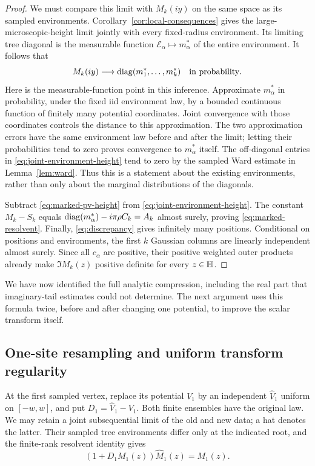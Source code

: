 \begin{proof}
We must compare this limit with $M_k(iy)$ on the same space as its
sampled environments. Corollary~\ref{cor:local-consequences} gives
the large-microscopic-height limit jointly with every fixed-radius
environment. Its limiting tree diagonal is the measurable function
$\mathcal E_\alpha\mapsto m_\alpha^*$ of the entire environment.
It follows that
\begin{equation}\label{eq:joint-environment-height}
 M_k(iy)\longrightarrow\operatorname{diag}(m_1^*,\ldots,m_k^*)
                         \quad\text{in probability}.
\end{equation}
Here is the measurable-function point in this inference. Approximate
$m_\alpha^*$ in probability, under the fixed iid environment law,
by a bounded continuous function of finitely many potential
coordinates. Joint convergence with those coordinates controls the
distance to this approximation. The two approximation errors have
the same environment law before and after the limit; letting their
probabilities tend to zero proves convergence to $m_\alpha^*$ itself.
The off-diagonal entries in \eqref{eq:joint-environment-height} tend
to zero by the sampled Ward estimate in Lemma~\ref{lem:ward}.
Thus this is a statement about the existing environments, rather than
only about the marginal distributions of the diagonals.

Subtract \eqref{eq:marked-pv-height} from
\eqref{eq:joint-environment-height}. The constant $M_k-S_k$ equals
$\operatorname{diag}(m_\alpha^*)-i\pi\rho C_k=A_k$ almost surely, proving
\eqref{eq:marked-resolvent}.
Finally, \eqref{eq:discrepancy} gives infinitely many positions.
Conditional on positions and environments, the first $k$ Gaussian
columns are linearly independent almost surely. Since all $c_\alpha$
are positive, their positive weighted outer products already make
$\Im M_k(z)$ positive definite for every $z\in\mathbb H$.
\end{proof}

We have now identified the full analytic compression, including the
real part that imaginary-tail estimates could not determine. The
next argument uses this formula twice, before and after changing one
potential, to improve the scalar transform itself.

\subsection{One-site resampling and uniform transform regularity}

At the first sampled vertex, replace its potential $V_1$ by an
independent $\widehat V_1$ uniform on $[-w,w]$, and put
$D_1=\widehat V_1-V_1$. Both finite ensembles have the original
law. We may retain a joint subsequential limit of the old and new
data; a hat denotes the latter. Their sampled tree environments
differ only at the indicated root, and the finite-rank resolvent
identity gives
\begin{equation}\label{eq:rank-one-resampling}
                   (1+D_1M_1(z))\widehat M_1(z)=M_1(z).
\end{equation}


